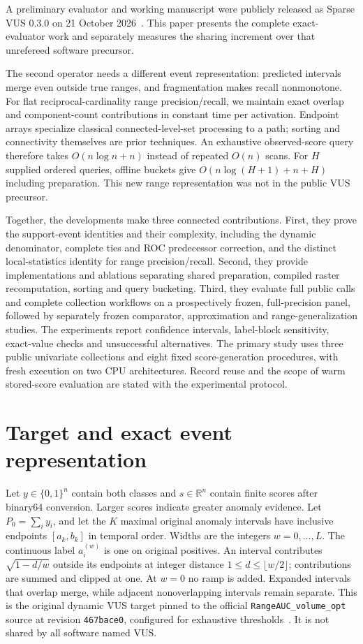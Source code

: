 A preliminary evaluator and working manuscript were publicly released as
Sparse VUS 0.3.0 on 21 October 2026~\cite{sparsevus03}. This paper presents the
complete exact-evaluator work and separately measures the sharing increment
over that unrefereed software precursor.

The second operator needs a different event representation: predicted intervals
merge even outside true ranges, and fragmentation makes recall nonmonotone.
For flat reciprocal-cardinality range precision/recall, we maintain exact
overlap and component-count contributions in constant time per activation.
Endpoint arrays specialize classical connected-level-set processing to a path;
sorting and connectivity themselves are prior techniques. An exhaustive
observed-score query therefore takes $O(n\log n+n)$ instead of repeated
$O(n)$ scans. For $H$ supplied ordered queries, offline buckets give
$O(n\log(H+1)+n+H)$ including preparation. This new range representation was
not in the public VUS precursor.

Together, the developments make three connected contributions. First, they prove the
support-event identities and their complexity, including the dynamic
denominator, complete ties and ROC predecessor correction, and the distinct
local-statistics identity for range precision/recall. Second, they provide
implementations and ablations separating shared preparation, compiled raster
recomputation, sorting and query bucketing. Third, they evaluate full public calls and complete
collection workflows on a prospectively frozen, full-precision panel, followed
by separately frozen comparator, approximation and range-generalization studies. The
experiments report confidence intervals, label-block sensitivity, exact-value
checks and unsuccessful alternatives. The primary study uses three public
univariate collections and eight fixed score-generation procedures, with fresh
execution on two CPU architectures. Record reuse and the scope of warm
stored-score evaluation are stated with the experimental protocol.
\section{Target and exact event representation}
Let $y\in\{0,1\}^n$ contain both classes and $s\in\mathbb{R}^n$ contain finite
scores after binary64 conversion. Larger scores indicate greater anomaly
evidence. Let $P_0=\sum_i y_i$, and let the $K$ maximal original anomaly
intervals have inclusive endpoints $[a_k,b_k]$ in temporal order. Widths are
the integers $w=0,\ldots,L$. The continuous label $a_i^{(w)}$ is one on
original positives. An interval contributes $\sqrt{1-d/w}$ outside its
endpoints at integer distance $1\le d\le\lfloor w/2\rfloor$; contributions
are summed and clipped at one. At $w=0$ no ramp is added. Expanded intervals
that overlap merge, while adjacent nonoverlapping intervals remain separate.
This is the original dynamic VUS target pinned to the official
\texttt{RangeAUC\_volume\_opt} source at revision
\texttt{467bace0}, configured for exhaustive thresholds~\cite{vusreference}.
It is not shared by all software named VUS.

